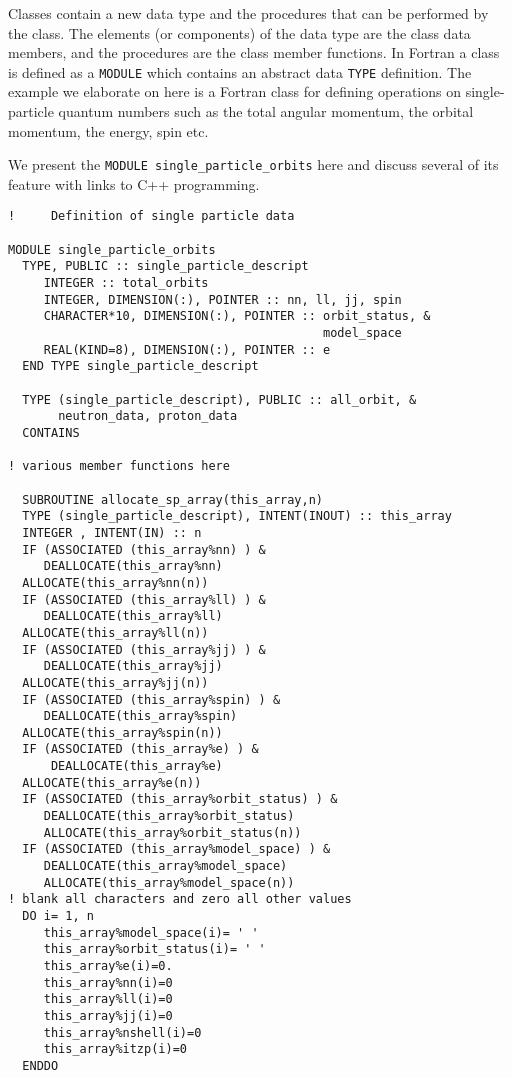Classes contain a new data type and the procedures that can be 
performed by the class. The elements (or components) of the data
type are the class data members, and the procedures are the class
member functions. In Fortran  a class is defined as a \verb?MODULE? which 
contains an abstract data \verb?TYPE? definition. 
The example we elaborate on here is a Fortran class for defining operations on single-particle
quantum numbers such as the total angular momentum, the orbital momentum, the energy, spin etc.

We present the \verb?MODULE single_particle_orbits? here and discuss several of its feature 
with links to C++ programming.
\begin{lstlisting}
!     Definition of single particle data

MODULE single_particle_orbits
  TYPE, PUBLIC :: single_particle_descript
     INTEGER :: total_orbits
     INTEGER, DIMENSION(:), POINTER :: nn, ll, jj, spin
     CHARACTER*10, DIMENSION(:), POINTER :: orbit_status, &
                                            model_space
     REAL(KIND=8), DIMENSION(:), POINTER :: e
  END TYPE single_particle_descript

  TYPE (single_particle_descript), PUBLIC :: all_orbit, &
       neutron_data, proton_data
  CONTAINS

! various member functions here 

  SUBROUTINE allocate_sp_array(this_array,n)
  TYPE (single_particle_descript), INTENT(INOUT) :: this_array
  INTEGER , INTENT(IN) :: n
  IF (ASSOCIATED (this_array%nn) ) &
     DEALLOCATE(this_array%nn)
  ALLOCATE(this_array%nn(n))
  IF (ASSOCIATED (this_array%ll) ) &
     DEALLOCATE(this_array%ll)
  ALLOCATE(this_array%ll(n))
  IF (ASSOCIATED (this_array%jj) ) &
     DEALLOCATE(this_array%jj)
  ALLOCATE(this_array%jj(n))
  IF (ASSOCIATED (this_array%spin) ) &
     DEALLOCATE(this_array%spin)
  ALLOCATE(this_array%spin(n))
  IF (ASSOCIATED (this_array%e) ) &
      DEALLOCATE(this_array%e)
  ALLOCATE(this_array%e(n))
  IF (ASSOCIATED (this_array%orbit_status) ) &
     DEALLOCATE(this_array%orbit_status)
     ALLOCATE(this_array%orbit_status(n))
  IF (ASSOCIATED (this_array%model_space) ) &
     DEALLOCATE(this_array%model_space)
     ALLOCATE(this_array%model_space(n))
! blank all characters and zero all other values
  DO i= 1, n
     this_array%model_space(i)= ' '
     this_array%orbit_status(i)= ' '
     this_array%e(i)=0.
     this_array%nn(i)=0
     this_array%ll(i)=0
     this_array%jj(i)=0
     this_array%nshell(i)=0
     this_array%itzp(i)=0
  ENDDO


\end{lstlisting}
